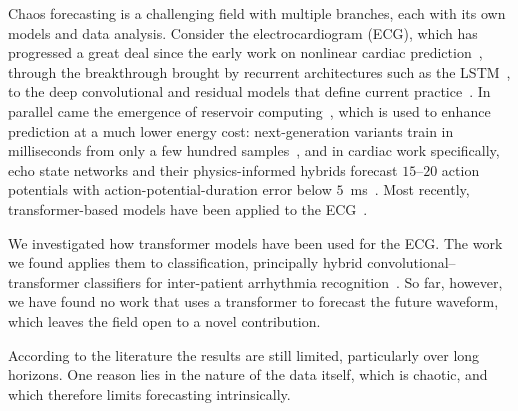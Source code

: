 Chaos forecasting is a challenging field with multiple branches, each with its
own models and data analysis. Consider the electrocardiogram (ECG), which has
progressed a great deal since the early work on nonlinear cardiac
prediction~\cite{babloyantz1988}, through the breakthrough brought by recurrent
architectures such as the LSTM~\cite{yildirim2018}, to the deep convolutional
and residual models that define current practice~\cite{hannun2019,ribeiro2020}.
In parallel came the emergence of reservoir computing~\cite{jaeger2004}, which
is used to enhance prediction at a much lower energy cost: next-generation
variants train in milliseconds from only a few hundred
samples~\cite{gauthier2021}, and in cardiac work specifically, echo state
networks and their physics-informed hybrids forecast $15$--$20$ action
potentials with action-potential-duration error below
$5$~ms~\cite{shahi2021,shahi2022}. Most recently, transformer-based models have
been applied to the ECG~\cite{xia2023,zhou2024}.

We investigated how transformer models have been used for the ECG. The work we
found applies them to classification, principally hybrid
convolutional--transformer classifiers for inter-patient arrhythmia
recognition~\cite{xia2023,zhou2024}. So far, however, we have found no work that
uses a transformer to forecast the future waveform, which leaves the field open
to a novel contribution.

According to the literature the results are still limited, particularly over
long horizons. One reason lies in the nature of the data itself, which is
chaotic, and which therefore limits forecasting intrinsically.

\medskip

